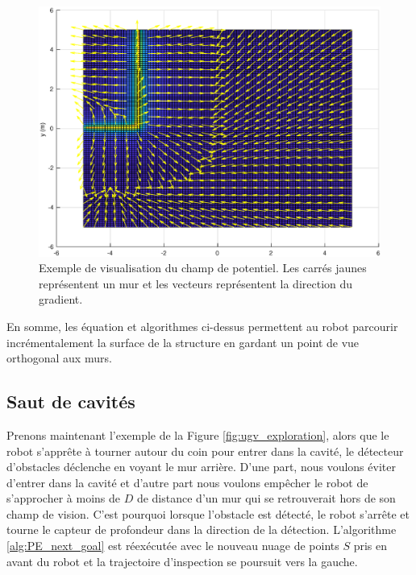 \begin{figure}[ht]
  \centering
  \includegraphics[width=0.7\linewidth]{images/champ_de_potentiel.eps}
  \caption{Exemple de visualisation du champ de potentiel. Les carrés jaunes représentent un mur et les vecteurs représentent la direction du gradient. }
  \label{fig:potential_field}
\end{figure}

En somme, les équation et algorithmes ci-dessus permettent au robot parcourir incrémentalement la surface de la structure en gardant un point de vue orthogonal aux murs.

\subsection{Saut de cavités}
\label{subsec:ugv_cavity_skip}

Prenons maintenant l'exemple de la Figure \ref{fig:ugv_exploration}, alors que le robot s'apprête à tourner autour du coin pour entrer dans la cavité, le détecteur d'obstacles déclenche en voyant le mur arrière. D'une part, nous voulons éviter d'entrer dans la cavité et d'autre part nous voulons empêcher le robot de s'approcher à moins de $D$ de distance d'un mur qui se retrouverait hors de son champ de vision. C'est pourquoi lorsque l'obstacle est détecté, le robot s'arrête et tourne le capteur de profondeur dans la direction de la détection. L'algorithme \ref{alg:PE_next_goal} est réexécutée avec le nouveau nuage de points $S$ pris en avant du robot et la trajectoire d'inspection se poursuit vers la gauche.

